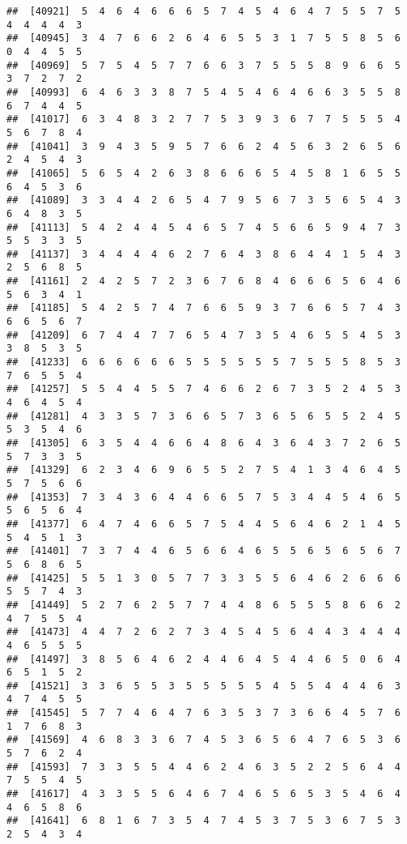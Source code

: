\documentclass[
]{book}
\begin{document}
\begin{verbatim}
##  [40921]  5  4  6  4  6  6  6  5  7  4  5  4  6  4  7  5  5  7  5  4  4  4  4  3
##  [40945]  3  4  7  6  6  2  6  4  6  5  5  3  1  7  5  5  8  5  6  0  4  4  5  5
##  [40969]  5  7  5  4  5  7  7  6  6  3  7  5  5  5  8  9  6  6  5  3  7  2  7  2
##  [40993]  6  4  6  3  3  8  7  5  4  5  4  6  4  6  6  3  5  5  8  6  7  4  4  5
##  [41017]  6  3  4  8  3  2  7  7  5  3  9  3  6  7  7  5  5  5  4  5  6  7  8  4
##  [41041]  3  9  4  3  5  9  5  7  6  6  2  4  5  6  3  2  6  5  6  2  4  5  4  3
##  [41065]  5  6  5  4  2  6  3  8  6  6  6  5  4  5  8  1  6  5  5  6  4  5  3  6
##  [41089]  3  3  4  4  2  6  5  4  7  9  5  6  7  3  5  6  5  4  3  6  4  8  3  5
##  [41113]  5  4  2  4  4  5  4  6  5  7  4  5  6  6  5  9  4  7  3  5  5  3  3  5
##  [41137]  3  4  4  4  4  6  2  7  6  4  3  8  6  4  4  1  5  4  3  2  5  6  8  5
##  [41161]  2  4  2  5  7  2  3  6  7  6  8  4  6  6  6  5  6  4  6  5  6  3  4  1
##  [41185]  5  4  2  5  7  4  7  6  6  5  9  3  7  6  6  5  7  4  3  6  6  5  6  7
##  [41209]  6  7  4  4  7  7  6  5  4  7  3  5  4  6  5  5  4  5  3  3  8  5  3  5
##  [41233]  6  6  6  6  6  6  5  5  5  5  5  5  7  5  5  5  8  5  3  7  6  5  5  4
##  [41257]  5  5  4  4  5  5  7  4  6  6  2  6  7  3  5  2  4  5  3  4  6  4  5  4
##  [41281]  4  3  3  5  7  3  6  6  5  7  3  6  5  6  5  5  2  4  5  5  3  5  4  6
##  [41305]  6  3  5  4  4  6  6  4  8  6  4  3  6  4  3  7  2  6  5  5  7  3  3  5
##  [41329]  6  2  3  4  6  9  6  5  5  2  7  5  4  1  3  4  6  4  5  5  7  5  6  6
##  [41353]  7  3  4  3  6  4  4  6  6  5  7  5  3  4  4  5  4  6  5  5  6  5  6  4
##  [41377]  6  4  7  4  6  6  5  7  5  4  4  5  6  4  6  2  1  4  5  5  4  5  1  3
##  [41401]  7  3  7  4  4  6  5  6  6  4  6  5  5  6  5  6  5  6  7  5  6  8  6  5
##  [41425]  5  5  1  3  0  5  7  7  3  3  5  5  6  4  6  2  6  6  6  5  5  7  4  3
##  [41449]  5  2  7  6  2  5  7  7  4  4  8  6  5  5  5  8  6  6  2  4  7  5  5  4
##  [41473]  4  4  7  2  6  2  7  3  4  5  4  5  6  4  4  3  4  4  4  4  6  5  5  5
##  [41497]  3  8  5  6  4  6  2  4  4  6  4  5  4  4  6  5  0  6  4  6  5  1  5  2
##  [41521]  3  3  6  5  5  3  5  5  5  5  5  4  5  5  4  4  4  6  3  4  7  4  5  5
##  [41545]  5  7  7  4  6  4  7  6  3  5  3  7  3  6  6  4  5  7  6  1  7  6  8  3
##  [41569]  4  6  8  3  3  6  7  4  5  3  6  5  6  4  7  6  5  3  6  5  7  6  2  4
##  [41593]  7  3  3  5  5  4  4  6  2  4  6  3  5  2  2  5  6  4  4  7  5  5  4  5
##  [41617]  4  3  3  5  5  6  4  6  7  4  6  5  6  5  3  5  4  6  4  4  6  5  8  6
##  [41641]  6  8  1  6  7  3  5  4  7  4  5  3  7  5  3  6  7  5  3  2  5  4  3  4

\end{verbatim}
\end{document}
